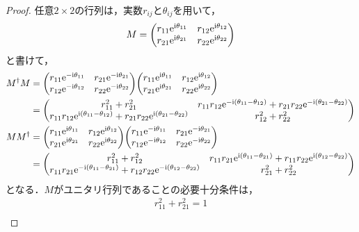 \documentclass{report}
\begin{document}
  \begin{proof}
    任意$2\times 2$の行列は，実数$r_{ij}$と$\theta_{ij}$を用いて，
    \begin{align}
      M = \mqty(
        r_{11}\e^{\i\theta_{11}} & r_{12}\e^{\i\theta_{12}} \\ 
        r_{21}\e^{\i\theta_{21}} & r_{22}\e^{\i\theta_{22}} \\ 
      )
    \end{align}
    と書けて，
    \begin{align}
      M^{\dag}M &= \mqty(
        r_{11}\e^{-\i\theta_{11}} & r_{21}\e^{-\i\theta_{21}} \\ 
        r_{12}\e^{-\i\theta_{12}} & r_{22}\e^{-\i\theta_{22}} \\ 
      )\mqty(
        r_{11}\e^{\i\theta_{11}} & r_{12}\e^{\i\theta_{12}} \\ 
        r_{21}\e^{\i\theta_{21}} & r_{22}\e^{\i\theta_{22}} \\ 
      ) \\ 
      &= \mqty(
        r_{11}^2 + r_{21}^2 & r_{11}r_{12}\e^{-\i(\theta_{11} - \theta_{12})} + r_{21}r_{22}\e^{-\i(\theta_{21} - \theta_{22})} \\ 
        r_{11}r_{12}\e^{\i(\theta_{11} - \theta_{12})} + r_{21}r_{22}\e^{\i(\theta_{21} - \theta_{22})} & r_{12}^2 + r_{22}^2 \\ 
      ) \\ 
      MM^{\dag} &= \mqty(
        r_{11}\e^{\i\theta_{11}} & r_{12}\e^{\i\theta_{12}} \\ 
        r_{21}\e^{\i\theta_{21}} & r_{22}\e^{\i\theta_{22}} \\ 
      )\mqty(
        r_{11}\e^{-\i\theta_{11}} & r_{21}\e^{-\i\theta_{21}} \\ 
        r_{12}\e^{-\i\theta_{12}} & r_{22}\e^{-\i\theta_{22}} \\ 
      ) \\ 
      &= \mqty(
        r_{11}^2 + r_{12}^2 & r_{11}r_{21}\e^{\i(\theta_{11} - \theta_{21})} + r_{11}r_{22}\e^{\i(\theta_{12} - \theta_{22})} \\ 
        r_{11}r_{21}\e^{-\i(\theta_{11} - \theta_{21})} + r_{12}r_{22}\e^{-\i(\theta_{12} - \theta_{22})} & r_{21}^2 + r_{22}^2 \\ 
      )
    \end{align}
    となる．$M$がユニタリ行列であることの必要十分条件は，
    \begin{align}
      r_{11}^2 + r_{21}^2 = 1 \label{r11-r21}\\ 

\end{align}
\end{proof}
\end{document}
